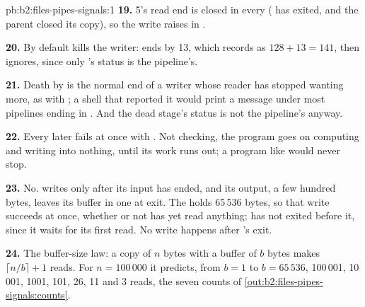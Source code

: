 \begin{solution}{pb:b2:files-pipes-signals:1}
\textbf{19.}  5's read end is closed in every  ( has exited, and the parent closed its copy),
so the write raises  in .

\textbf{20.} By default  kills the writer:  ends by  13, which 
records as $128 + 13 = 141$, then ignores, since only 's status is the pipeline's.

\textbf{21.} Death by  is the normal end of a writer whose reader has stopped wanting more, as with
; a shell that reported it would print a message under most pipelines ending in . And
the dead stage's status is not the pipeline's anyway.

\textbf{22.} Every later  fails at once with . Not checking, the program goes on computing
and writing into nothing, until its work runs out; a program like  would never stop.

\textbf{23.} No.  writes only after its input has ended, and its output, a few hundred bytes, leaves
its buffer in one  at exit. The  holds 65\,536 bytes, so that write succeeds at once, whether or not
 has yet read anything;  has not exited before it, since it waits for its first read. No write
happens after 's exit.

\textbf{24.} The buffer-size law: a copy of $n$ bytes with a buffer of $b$ bytes makes $\lceil n/b \rceil + 1$
reads. For $n = 100\,000$ it predicts, from $b = 1$ to $b = 65\,536$, 100\,001, 10\,001, 1001, 101, 26, 11 and 3
reads, the seven counts of \cref{out:b2:files-pipes-signals:counts}.
\end{solution}
